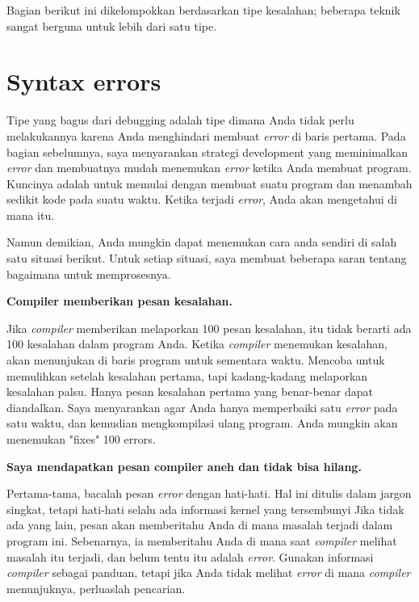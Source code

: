 Bagian berikut ini dikelompokkan berdasarkan tipe kesalahan; beberapa teknik sangat berguna untuk lebih dari satu tipe.

\section{Syntax errors}
Tipe yang bagus dari debugging adalah tipe dimana Anda tidak perlu melakukannya karena Anda menghindari membuat \textit{error} di baris pertama. Pada bagian sebelumnya, saya menyarankan strategi development yang meminimalkan \textit{error} dan membuatnya mudah menemukan \textit{error} ketika Anda membuat program. Kuncinya adalah untuk memulai dengan membuat suatu program dan menambah sedikit kode pada suatu waktu. Ketika terjadi \textit{error}, Anda akan mengetahui di mana itu. \par 

\noindent Namun demikian, Anda mungkin dapat menemukan cara anda sendiri di salah satu situasi berikut. Untuk setiap situasi, saya membuat beberapa saran tentang bagaimana untuk memprosesnya.

\noindent \textbf{Compiler memberikan pesan kesalahan.}

\noindent Jika \textit{compiler} memberikan melaporkan 100 pesan kesalahan, itu tidak berarti ada 100 kesalahan dalam program Anda. Ketika \textit{compiler} menemukan kesalahan, akan menunjukan di baris program untuk sementara waktu. Mencoba untuk memulihkan setelah kesalahan pertama, tapi kadang-kadang melaporkan kesalahan palsu.
Hanya pesan kesalahan pertama yang benar-benar dapat diandalkan. Saya menyarankan agar Anda hanya memperbaiki satu \textit{error} pada satu waktu, dan kemudian mengkompilasi ulang program. Anda mungkin akan menemukan "fixes" 100 errors.

\noindent \textbf{Saya mendapatkan pesan compiler aneh dan tidak bisa hilang.}

\noindent Pertama-tama, bacalah pesan \textit{error} dengan hati-hati. Hal ini ditulis dalam jargon singkat, tetapi hati-hati selalu ada informasi kernel yang tersembunyi
Jika tidak ada yang lain, pesan akan memberitahu Anda di mana masalah terjadi dalam program ini. Sebenarnya, ia memberitahu Anda di mana saat \textit{compiler} melihat masalah itu terjadi, dan belum tentu itu adalah \textit{error}. Gunakan informasi \textit{compiler} sebagai panduan, tetapi jika Anda tidak melihat \textit{error} di mana \textit{compiler} menunjuknya, perluaslah pencarian.

